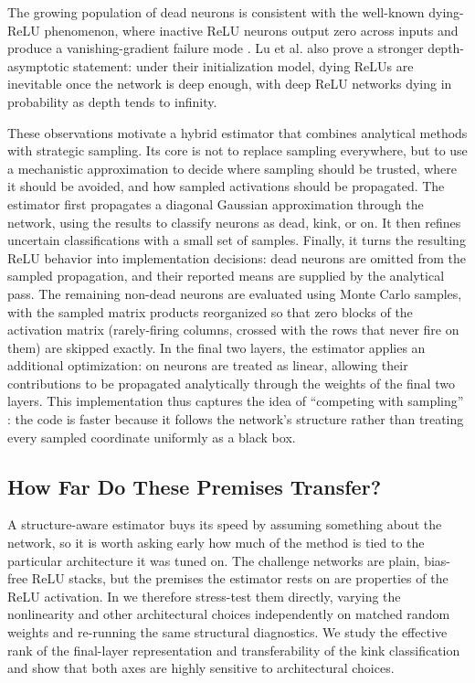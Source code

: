 The growing population of dead neurons is consistent with the well-known dying-ReLU phenomenon, where inactive ReLU neurons output zero across inputs and produce a vanishing-gradient failure mode \citep{lu2020dyingrelu, dufortmaxwell}. Lu et al. also prove a stronger depth-asymptotic statement: under their initialization model, dying ReLUs are inevitable once the network is deep enough, with deep ReLU networks dying in probability as depth tends to infinity. 

These observations motivate a hybrid estimator that combines analytical methods with strategic sampling. Its core is not to replace sampling everywhere, but to use a mechanistic approximation to decide where sampling should be trusted, where it should be avoided, and how sampled activations should be propagated. The estimator first propagates a diagonal Gaussian approximation through the network, using the results to classify neurons as dead, kink, or on. It then refines uncertain classifications with a small set of samples. Finally, it turns the resulting ReLU behavior into implementation decisions: dead neurons are omitted from the sampled propagation, and their reported means are supplied by the analytical pass. The remaining non-dead neurons are evaluated using Monte Carlo samples, with the sampled matrix products reorganized so that zero blocks of the activation matrix (rarely-firing columns, crossed with the rows that never fire on them) are skipped exactly. In the final two layers, the estimator applies an additional optimization: on neurons are treated as linear, allowing their contributions to be propagated analytically through the weights of the final two layers. This implementation thus captures the idea of ``competing with sampling'' \citep{arcCompetingSampling2025}: the code is faster because it follows the network's structure rather than treating every sampled coordinate uniformly as a black box.

\subsection{How Far Do These Premises Transfer?}

A structure-aware estimator buys its speed by assuming something about the network, so it is worth asking early how much of the method is tied to the particular architecture it was tuned on. The challenge networks are plain, bias-free ReLU stacks, but the premises the estimator rests on are properties of the ReLU activation. In  we therefore stress-test them directly, varying the nonlinearity and other architectural choices independently on matched random weights and re-running the same structural diagnostics. We study the effective rank of the final-layer representation and transferability of the kink classification and show that both axes are highly sensitive to architectural choices.

